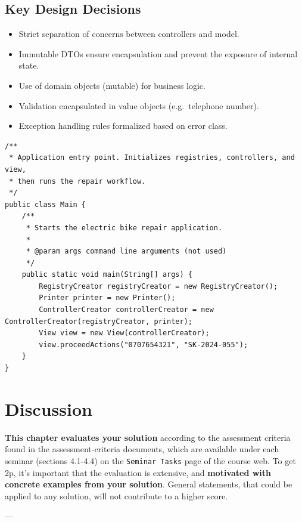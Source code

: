 \documentclass[a4paper]{scrartcl}
\begin{document}
\subsection{Key Design Decisions}
\begin{itemize}
  \item Strict separation of concerns between controllers and model.
  \item Immutable DTOs ensure encapsulation and prevent the exposure of 
        internal state.
  \item Use of domain objects (mutable) for business logic.
  \item Validation encapsulated in value objects (e.g.\ telephone number).
  \item Exception handling rules formalized based on error class.
\end{itemize}

\begin{lstlisting}[style=javastyle, caption={Main class entry point}]
/**
 * Application entry point. Initializes registries, controllers, and view, 
 * then runs the repair workflow.
 */
public class Main {
    /**
     * Starts the electric bike repair application.
     *
     * @param args command line arguments (not used)
     */
    public static void main(String[] args) {
        RegistryCreator registryCreator = new RegistryCreator();
        Printer printer = new Printer();
        ControllerCreator controllerCreator = new ControllerCreator(registryCreator, printer);
        View view = new View(controllerCreator);
        view.proceedActions("0707654321", "SK-2024-055");
    }
}
\end{lstlisting}

\section{Discussion}

\textbf{This chapter evaluates your solution} according to the assessment criteria found in the assessment-criteria documents, which are available under each seminar (sections 4.1-4.4) on the \texttt{Seminar Tasks} page of the course web. To get 2p, it's important that the evaluation is extensive, and \textbf{motivated with concrete examples from your solution}. General statements, that could be applied to any solution, will not contribute to a higher score.

---
\end{document}
